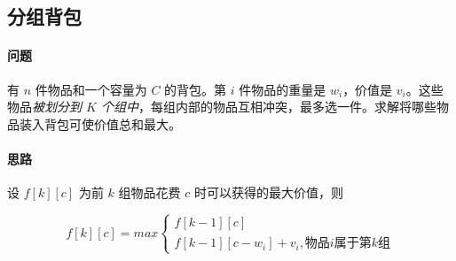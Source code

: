 \subsection{分组背包}
	\paragraph{问题} 有 $n$ 件物品和一个容量为 $C$ 的背包。第 $i$ 件物品的重量是 $w_i$，价值是 $v_i$。这些物品\emph{被划分到 $K$ 个组中}，每组内部的物品互相冲突，最多选一件。求解将哪些物品装入背包可使价值总和最大。

	\paragraph{思路} 设 $f[k][c]$ 为前 $k$ 组物品花费 $c$ 时可以获得的最大价值，则

		\[ f[k][c] = max \left\{ 
			\begin{array}{l}
			f[k-1][c]				\\
			f[k-1][c-w_i]+v_i, \textrm{物品} i \textrm{属于第} k \textrm{组}
			\end{array}
			\right. \]
